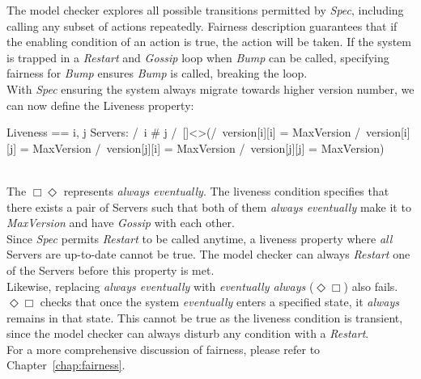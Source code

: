 The model checker explores all possible transitions permitted by \textit{Spec}, 
including calling any subset of actions repeatedly.  Fairness description
guarantees that if the enabling condition of an action is true, the action will
be taken. If the system is trapped in a \textit{Restart} and \textit{Gossip}
loop when \textit{Bump} can be called, specifying fairness for \textit{Bump}
ensures \textit{Bump} is called, breaking the loop.\\

With \textit{Spec} ensuring the system always migrate towards higher version
number, we can now define the Liveness property:\\

\begin{tla}
Liveness == 
    \E i, j \in Servers: 
        /\ i # j
        /\ []<>(/\ version[i][i] = MaxVersion
                /\ version[i][j] = MaxVersion
                /\ version[j][i] = MaxVersion
                /\ version[j][j] = MaxVersion)
\end{tla}
\begin{tlatex}
%
%
%
%
%
%
\end{tlatex}
\\

The $\Box\Diamond$ represents \textit{always eventually}. The liveness condition
specifies that there exists a pair of Servers such that both of them
\textit{always eventually} make it to \textit{MaxVersion} and have
\textit{Gossip} with each other.\\

Since \textit{Spec} permits \textit{Restart} to be called anytime, a liveness
property where \textit{all} Servers are up-to-date cannot be true. The model
checker can always \textit{Restart} one of the Servers before this property is
met.\\

Likewise, replacing \textit{always eventually} with \textit{eventually always}
($\Diamond\Box$) also fails. $\Diamond\Box$ checks that once the system
\textit{eventually} enters a specified state, it \textit{always} remains in that
state. This cannot be true as the liveness condition is transient, since the
model checker can always disturb any condition with a \textit{Restart}.\\

For a more comprehensive discussion of fairness, please refer to
Chapter~\ref{chap:fairness}.

% 

